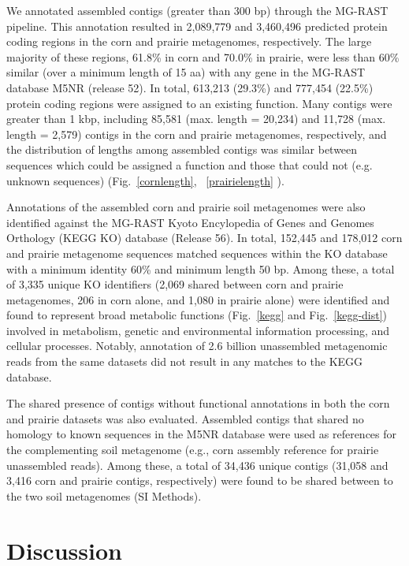 \documentclass{pnastwo}
\begin{document}
\begin{article}
We annotated assembled contigs (greater than 300 bp) through the MG-RAST
pipeline. This annotation resulted in 2,089,779 and 3,460,496 predicted protein
coding regions in the corn and prairie metagenomes, respectively. The large
majority of these regions, 61.8\% in corn and 70.0\% in prairie, were less than 60\% similar (over a minimum length of 15 aa) with any gene in the MG-RAST
database M5NR (release 52). In total,
613,213 (29.3\%) and 777,454 (22.5\%) protein coding regions were assigned to an
existing function. Many contigs were greater than 1 kbp, including 85,581 (max.
length = 20,234) and 11,728 (max. length = 2,579) contigs in the corn and
prairie metagenomes, respectively, and the distribution of lengths among
assembled contigs was similar between sequences which could be assigned a
function and those that could not (e.g. unknown sequences) (Fig.~\ref{cornlength}, ~\ref{prairielength}
).

Annotations of the assembled corn and prairie soil metagenomes
were also identified against the MG-RAST Kyoto Encylopedia of Genes and Genomes
Orthology (KEGG KO) database (Release 56). In total, 152,445 and 178,012 corn
and prairie metagenome sequences matched sequences within the KO database with a
minimum identity 60\% and minimum length 50 bp. Among these, a total of 3,335
unique KO identifiers (2,069 shared between corn and prairie metagenomes, 206 in
corn alone, and 1,080 in prairie alone) were identified and found to represent
broad metabolic functions (Fig.~\ref{kegg} and Fig.~\ref{kegg-dist}) involved in
metabolism, genetic and environmental information processing, and cellular
processes. Notably, annotation of 2.6 billion unassembled metagenomic reads from the same
datasets did not result in any matches to the KEGG database. 


The shared presence of contigs without functional annotations in both the corn
and prairie datasets was also evaluated. Assembled contigs that shared no
homology to known sequences in the M5NR database were used as references for the
complementing soil metagenome (e.g., corn assembly reference for prairie
unassembled reads). Among these, a total of 34,436 unique contigs (31,058 and 3,416 corn and prairie contigs, respectively) were found to be shared between to the two soil metagenomes (SI Methods). 

\section*{Discussion}

\end{article}
\end{document}

